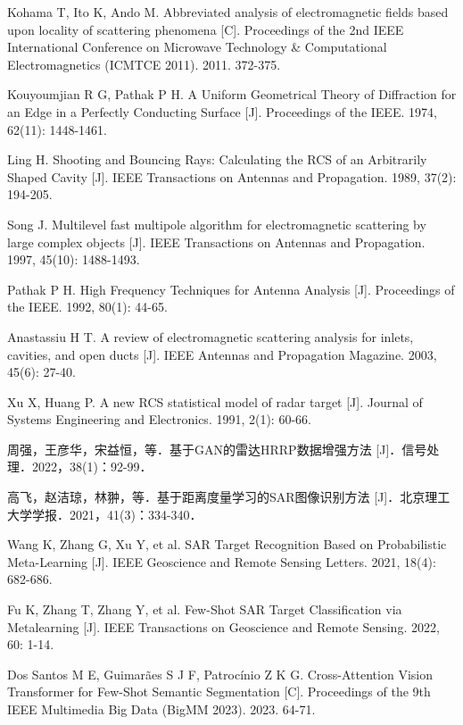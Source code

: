 \documentclass[doctor,twoside,ttf]{nudtpaper}
\begin{document}
\begin{thebibliography}{99}
 Kohama T, Ito K, Ando M. Abbreviated analysis of electromagnetic fields based upon locality of scattering phenomena [C]. Proceedings of the 2nd IEEE International Conference on Microwave Technology \& Computational Electromagnetics (ICMTCE 2011). 2011. 372-375.

 Kouyoumjian R G, Pathak P H. A Uniform Geometrical Theory of Diffraction for an Edge in a Perfectly Conducting Surface [J]. Proceedings of the IEEE. 1974, 62(11): 1448-1461.

 Ling H. Shooting and Bouncing Rays: Calculating the RCS of an Arbitrarily Shaped Cavity [J]. IEEE Transactions on Antennas and Propagation. 1989, 37(2): 194-205.


 Song J. Multilevel fast multipole algorithm for electromagnetic scattering by large complex objects [J]. IEEE Transactions on Antennas and Propagation. 1997, 45(10): 1488-1493.

 Pathak P H. High Frequency Techniques for Antenna Analysis [J]. Proceedings of the IEEE. 1992, 80(1): 44-65.

 Anastassiu H T. A review of electromagnetic scattering analysis for inlets, cavities, and open ducts [J]. IEEE Antennas and Propagation Magazine. 2003, 45(6): 27-40.

 Xu X, Huang P. A new RCS statistical model of radar target [J]. Journal of Systems Engineering and Electronics. 1991, 2(1): 60-66.

 周强，王彦华，宋益恒，等．基于GAN的雷达HRRP数据增强方法 [J]．信号处理．2022，38(1)：92-99．

 高飞，赵洁琼，林翀，等．基于距离度量学习的SAR图像识别方法 [J]．北京理工大学学报．2021，41(3)：334-340．

 Wang K, Zhang G, Xu Y, et al. SAR Target Recognition Based on Probabilistic Meta-Learning [J]. IEEE Geoscience and Remote Sensing Letters. 2021, 18(4): 682-686.

 Fu K, Zhang T, Zhang Y, et al. Few-Shot SAR Target Classification via Metalearning [J]. IEEE Transactions on Geoscience and Remote Sensing. 2022, 60: 1-14.

 Dos Santos M E, Guimarães S J F, Patrocínio Z K G. Cross-Attention Vision Transformer for Few-Shot Semantic Segmentation [C]. Proceedings of the 9th IEEE Multimedia Big Data (BigMM 2023). 2023. 64-71.


\end{thebibliography}
\end{document}
